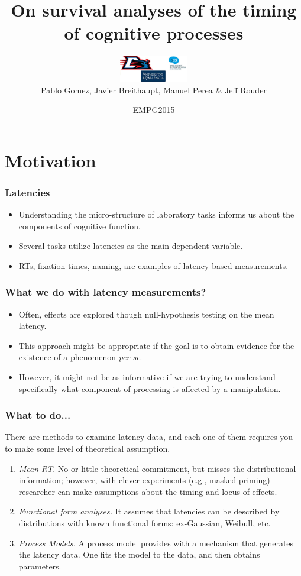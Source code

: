 \documentclass{beamer}
\title[Survival and latencies]{On survival analyses of the 
timing of cognitive processes}
\author[Pablo, Javier, Manolo \& Jeff]{\includegraphics[width=3cm]{images.jpg}\\Pablo Gomez, Javier Breithaupt,  Manuel Perea \& Jeff Rouder}
\institute[UdeV-DPU-Mizzou]{DePaul U, Universitat de Valencia, U of Missouri}
\date{EMPG2015}
\begin{document}
\frame{\titlepage}



\section{Motivation}
{
	\frame
	{
		\frametitle{Latencies}
		\begin{itemize}
			\item Understanding the micro-structure of laboratory tasks informs us about the components of cognitive function.
			\item Several tasks utilize latencies as the main dependent variable.
			\item RTs, fixation times, naming, are examples of latency based measurements.
		\end{itemize}
	}
	
			
	\frame
	{
		\frametitle{What we do with latency measurements?}
		\begin{itemize}
			\item Often, effects are explored though null-hypothesis testing on the mean latency.
     			\item This approach might be appropriate if the goal is to obtain evidence for the existence of a phenomenon \emph{per se}.
     			\item However, it might not be as informative if we are trying to understand specifically what component of processing is affected by a manipulation.
  		\end{itemize}
	 }
	 
	
	\frame
	{
  		\frametitle{What to do...}
  		There are methods to examine latency data, and each one of them requires you to make some level of theoretical assumption.
  		\begin{enumerate}
    			\item<1-> \emph{Mean RT}. No or little theoretical commitment, but misses the distributional information; however, with clever experiments (e.g., masked priming) researcher can make assumptions about the timing and locus of effects.
    			\item<2-> \emph{Functional form analyses.} It assumes that latencies can be described by distributions with known functional forms: ex-Gaussian, Weibull, etc.
    			\item<3-> \emph{Process Models.} A process model provides with a mechanism that generates the latency data. One fits the model to the data, and  then obtains parameters.
  		\end{enumerate}
	}

}
\end{document}
